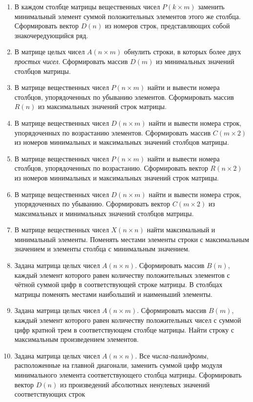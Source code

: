 \begin{enumerate}
\item В каждом столбце матрицы вещественных чисел $P(k\times m)$ заменить
минимальный элемент суммой положительных элементов этого же столбца. Сформировать вектор
$D(n)$ из номеров строк, представляющих собой знакочередующийся ряд.
\item В матрице целых чисел $A(n\times m)$ обнулить строки, в которых более двух
\emph{простых чисел}. Сформировать массив $D(m)$ из минимальных значений столбцов матрицы.
\item В матрице вещественных чисел $P(n\times m)$ найти и вывести номера столбцов,
упорядоченных по убыванию элементов. Сформировать массив $R(n)$ из максимальных значений строк
матрицы.
\item В матрице вещественных чисел $D(n\times m)$ найти и вывести номера строк,
упорядоченных по возрастанию элементов. Сформировать массив $C(m\times 2)$ из
номеров  минимальных и максимальных значений столбцов матрицы.
\item В матрице вещественных чисел $P(n\times m)$ найти и вывести номера столбцов,
упорядоченных по возрастанию. Сформировать вектор $R(n\times 2)$ из номеров  минимальных и
максимальных значений строк матрицы. 
\item В матрице вещественных чисел $D(n\times m)$ найти и вывести номера строк,
упорядоченных по убыванию. Сформировать вектор $C(m\times 2)$ из максимальных и
минимальных значений столбцов матрицы.
\item В матрице вещественных чисел $X(n\times n)$ найти максимальный и минимальный элементы. Поменять
местами элементы строки с максимальным значением и элементы столбца с минимальным значением.
\item Задана матрица целых чисел $A(n\times n)$. Сформировать массив $B(n)$,
каждый элемент которого равен количеству положительных элементов с чётной суммой цифр в  соответствующей строке
матрицы. В столбцах матрицы поменять местами наибольший и наименьший элементы.
\item Задана матрица целых чисел $A(n\times m)$. Сформировать массив
$B(m)$, каждый элемент которого равен количеству положительных чисел с суммой цифр кратной
трем в  соответствующем столбце матрицы. Найти строку с максимальным произведением элементов.
\item Задана матрица целых чисел $A(n\times n)$. Все \emph{числа-палиндромы},
расположенные на главной диагонали, заменить суммой цифр модуля минимального элемента соответствующего столбца матрицы.
Сформировать вектор $D(n)$ из произведений абсолютных ненулевых значений соответствующих строк

\end{enumerate}
